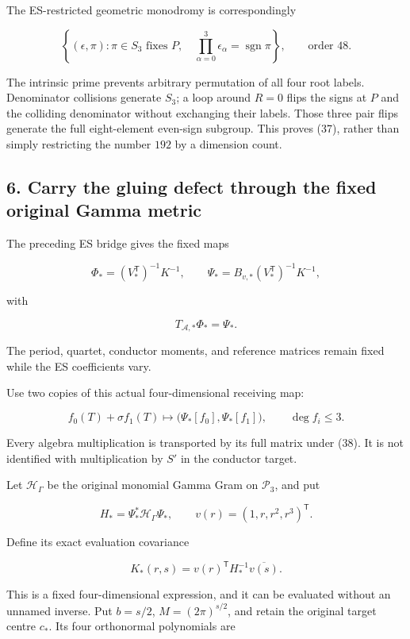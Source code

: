 The ES-restricted geometric monodromy is correspondingly

\[
\boxed{
\left\{
(\epsilon,\pi):
\pi\in S_3\text{ fixes }P,\quad
\prod_{\alpha=0}^3\epsilon_\alpha=\operatorname{sgn}\pi
\right\},
\qquad\text{order }48.
}
\tag{37}
\]

The intrinsic prime prevents arbitrary permutation of all four root
labels. Denominator collisions generate \(S_3\); a loop around \(R=0\)
flips the signs at \(P\) and the colliding denominator without
exchanging their labels. Those three pair flips generate the full
eight-element even-sign subgroup. This proves (37), rather than simply
restricting the number \(192\) by a dimension count.

\subsection{6. Carry the gluing defect through the fixed original Gamma
metric}\label{carry-the-gluing-defect-through-the-fixed-original-gamma-metric}

The preceding ES bridge gives the fixed maps

\[
\Phi_*=(V_*^{\mathsf T})^{-1}K^{-1},
\qquad
\Psi_*=B_{v,*}(V_*^{\mathsf T})^{-1}K^{-1},
\]

with

\[
T_{\mathcal A,*}\Phi_*=\Psi_*.
\]

The period, quartet, conductor moments, and reference matrices remain
fixed while the ES coefficients vary.

Use two copies of this actual four-dimensional receiving map:

\[
f_0(T)+\sigma f_1(T)
\longmapsto
\bigl(\Psi_*[f_0],\Psi_*[f_1]\bigr),
\qquad \deg f_i\le3.
\tag{38}
\]

Every algebra multiplication is transported by its full matrix under
(38). It is not identified with multiplication by \(S'\) in the
conductor target.

Let \(\mathcal H_\Gamma\) be the original monomial Gamma Gram on
\(\mathcal P_3\), and put

\[
H_*=\Psi_*^*\mathcal H_\Gamma\Psi_*,
\qquad
v(r)=(1,r,r^2,r^3)^{\mathsf T}.
\]

Define its exact evaluation covariance

\[
K_*(r,s)=v(r)^{\mathsf T}H_*^{-1}\overline{v(s)}.
\tag{39}
\]

This is a fixed four-dimensional expression, and it can be evaluated
without an unnamed inverse. Put \(b=s/2\), \(M=(2\pi)^{s/2}\), and
retain the original target centre \(c_*\). Its four orthonormal
polynomials are

